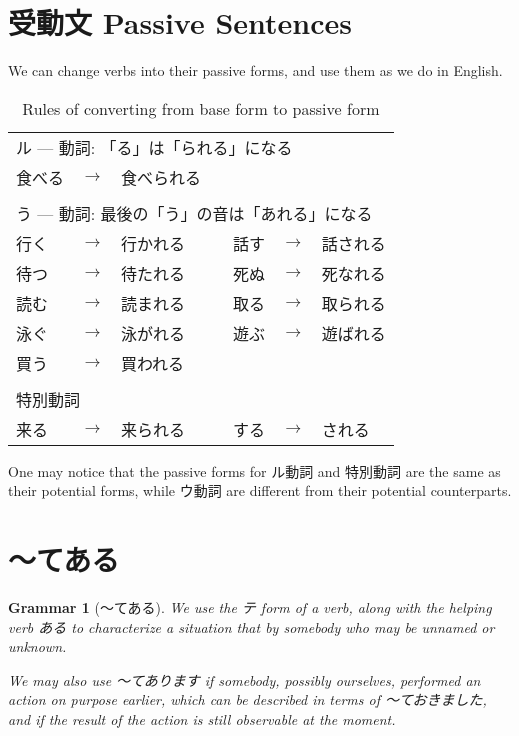 \documentclass[notoc,notitlepage]{tufte-book}
\newtheorem{grammar}{\faBook Grammar}
\begin{document}

\section{受動文 Passive Sentences}%
\label{sec:jyudoubun_passive_sentences}

We can change verbs into their passive forms, and use them as we do in English.

\begin{table}[ht]
  \centering
  \caption{Rules of converting from base form to passive form}
  \label{table:rules_of_converting_from_base_form_to_passive_form}
  \begin{tabular}{l c l c l c l}
  \multicolumn{7}{l}{ル --- 動詞: 「る」は「られる」になる} \\
  食べる & $\to$ & 食べられる &  &  &  &  \\
  $  $ \\
  \multicolumn{7}{l}{う --- 動詞: 最後の「う」の音は「あれる」になる} \\
  行く & $\to$ & 行かれる & & 話す & $\to$ & 話される \\
  待つ & $\to$ & 待たれる & & 死ぬ & $\to$ & 死なれる \\
  読む & $\to$ & 読まれる & & 取る & $\to$ & 取られる \\
  泳ぐ & $\to$ & 泳がれる & & 遊ぶ & $\to$ & 遊ばれる \\
  買う & $\to$ & 買われる \\
  $  $ \\
  \multicolumn{7}{l}{特別動詞} \\
  来る & $\to$ & 来られる & & する & $\to$ & される
  \end{tabular}
\end{table}

\begin{note}
  One may notice that the passive forms for ル動詞 and 特別動詞
  are the same as their potential forms, while
  ウ動詞 are different from their potential counterparts.
\end{note}


\section{〜てある}%
\label{sec:tearu}

\begin{grammar}[〜てある]\label{grammar:_tearu}
  We use the テ form of a verb, along with the helping verb ある
  to characterize a situation that  by somebody who may be unnamed or unknown.

  We may also use 〜てあります if somebody, possibly ourselves,
  performed an action on purpose earlier, which can be described
  in terms of 〜ておきました, and if the result of the action
  is still observable at the moment.
\end{grammar}
\end{document}
